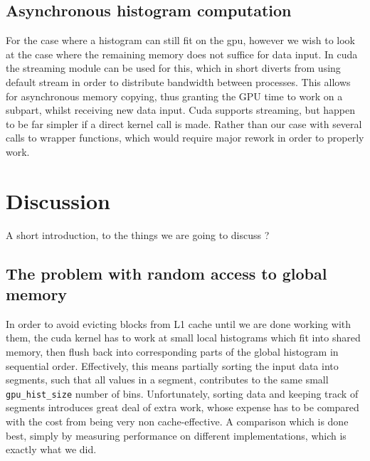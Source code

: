 \documentclass[12pt, a4paper, hidelinks]{article}
\renewcommand{\tt}[1]{\texttt{#1}}
\begin{document}
\subsection{Asynchronous histogram computation}
For the case where a histogram can still fit on the gpu, however
we wish to look at the case where the remaining memory does not suffice
for data input.
In cuda the streaming module can be used for this, which in short diverts
from using default stream in order to distribute bandwidth between processes.
This allows for asynchronous memory copying, thus granting the GPU time to
work on a subpart, whilst receiving new data input. Cuda supports streaming,
but happen to be far simpler if a direct kernel call is made. Rather than our
case with several calls to wrapper functions, which would require major
rework in order to properly work.

\section{Discussion}
A short introduction, to the things we are going to discuss ?

\subsection{The problem with random access to global memory}
In order to avoid evicting blocks from L1 cache until we are done working with them,
the cuda kernel has to work at small local histograms which fit into shared memory,
then flush back into corresponding parts of the global histogram
in sequential order. Effectively, this means partially sorting the
input data into segments, such that all values in a segment,
contributes to the same small \tt{gpu\_hist\_size} number of bins.
Unfortunately, sorting data and keeping track of segments
introduces great deal of extra work, whose expense has to be compared
with the cost from being very non cache-effective.
A comparison which is done best,
simply by measuring performance on different implementations,
which is exactly what we did.

\end{document}
